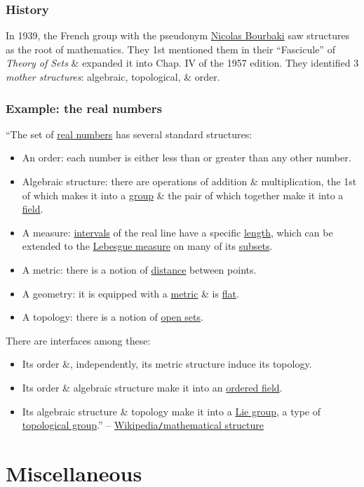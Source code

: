 \documentclass{article}
\begin{document}
\subsubsection{History}
In 1939, the French group with the pseudonym \href{https://en.wikipedia.org/wiki/Nicolas_Bourbaki}{\sc Nicolas Bourbaki} saw structures as the root of mathematics. They 1st mentioned them in their ``Fascicule'' of {\it Theory of Sets} \& expanded it into Chap. IV of the 1957 edition. They identified 3 {\it mother structures}: algebraic, topological, \& order.

\subsubsection{Example: the real numbers}
``The set of \href{https://en.wikipedia.org/wiki/Real_number}{real numbers} has several standard structures:
\begin{itemize}
	\item An order: each number is either less than or greater than any other number.
	\item Algebraic structure: there are operations of addition \& multiplication, the 1st of which makes it into a \href{https://en.wikipedia.org/wiki/Group_theory}{group} \& the pair of which together make it into a \href{https://en.wikipedia.org/wiki/Field_(mathematics)}{field}.
	\item A measure: \href{https://en.wikipedia.org/wiki/Interval_(mathematics)}{intervals} of the real line have a specific \href{https://en.wikipedia.org/wiki/Length}{length}, which can be extended to the \href{https://en.wikipedia.org/wiki/Lebesgue_measure}{Lebesgue measure} on many of its \href{https://en.wikipedia.org/wiki/Subset}{subsets}.
	\item A metric: there is a notion of \href{https://en.wikipedia.org/wiki/Metric_(mathematics)}{distance} between points.
	\item A geometry: it is equipped with a \href{https://en.wikipedia.org/wiki/Metric_(mathematics)}{metric} \& is \href{https://en.wikipedia.org/wiki/Flat_space}{flat}.
	\item A topology: there is a notion of \href{https://en.wikipedia.org/wiki/Open_set}{open sets}.
\end{itemize}
There are interfaces among these:
\begin{itemize}
	\item Its order \&, independently, its metric structure induce its topology.
	\item Its order \& algebraic structure make it into an \href{https://en.wikipedia.org/wiki/Ordered_field}{ordered field}.
	\item Its algebraic structure \& topology make it into a \href{https://en.wikipedia.org/wiki/Lie_group}{Lie group}, a type of \href{https://en.wikipedia.org/wiki/Topological_group}{topological group}.'' -- \href{https://en.wikipedia.org/wiki/Mathematical_structure}{Wikipedia{\tt/}mathematical structure}
\end{itemize}


\section{Miscellaneous}


\printbibliography[heading=bibintoc]
	
\end{document}
